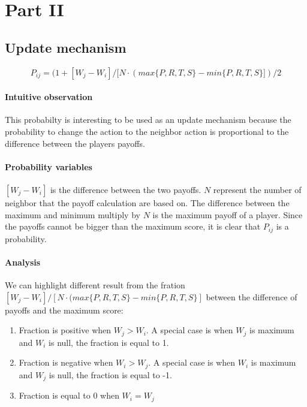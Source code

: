 \documentclass[letterpaper]{article}
\begin{document}
\section{Part II}

\subsection{Update mechanism}

\begin{equation}
    P_{ij} = (1 + [W_j - W_i] / [N\cdot(max\{P, R, T, S\}
    - min\{P, R, T, S\}])/2
\end{equation}

\paragraph{Intuitive observation}

This probabilty is interesting to be used as an update mechanism because
the probability to change the action to the neighbor action is
proportional to the difference between the players payoffs.

\paragraph{Probability variables}

$[W_j - W_i]$ is the difference between the two payoffs.
$N$ represent the number
of neighbor that the payoff calculation are based on. The difference
between the maximum and minimum multiply by $N$ is
the maximum payoff of a player. Since the payoffs cannot be bigger than
the maximum score, it is clear that $P_{ij}$ is a probability.

\paragraph{Analysis}

We can highlight different result from
the fration
$[W_j - W_i] / [N\cdot(max\{P, R, T, S\}
- min\{P, R, T, S\}]$
between the difference of payoffs and the maximum score:

\begin{enumerate}
    \item Fraction is positive when $W_j > W_i$. A special
    case is when $W_j$ is maximum and $W_i$ is null, the fraction is equal to 1.
    \item Fraction is negative when $W_i > W_j$. A special
    case is when $W_i$ is maximum and $W_j$ is null,
    the fraction is equal to -1.
    \item Fraction is equal to 0 when $W_i = W_j$
\end{enumerate}
\end{document}
